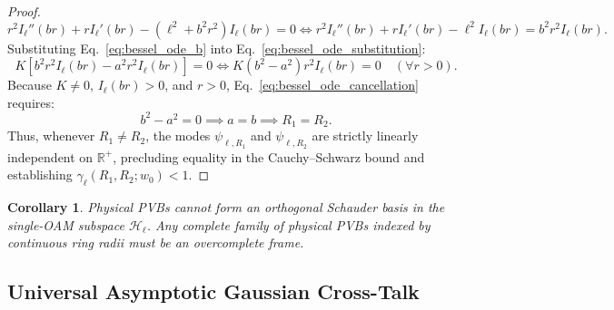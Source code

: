 \documentclass[11pt,a4paper]{article}
\newtheorem{corollary}{Corollary}
\begin{document}
\begin{proof}
\begin{equation}
r^2 I_\ell''(b r) + r I_\ell'(b r) - (\ell^2 + b^2 r^2) I_\ell(b r) = 0 \iff r^2 I_\ell''(b r) + r I_\ell'(b r) - \ell^2 I_\ell(b r) = b^2 r^2 I_\ell(b r).
\label{eq:bessel_ode_b}
\end{equation}
Substituting Eq.~\eqref{eq:bessel_ode_b} into Eq.~\eqref{eq:bessel_ode_substitution}:
\begin{equation}
K \left[ b^2 r^2 I_\ell(b r) - a^2 r^2 I_\ell(b r) \right] = 0 \iff K (b^2 - a^2) r^2 I_\ell(b r) = 0 \quad (\forall r > 0).
\label{eq:bessel_ode_cancellation}
\end{equation}
Because $K \neq 0$, $I_\ell(b r) > 0$, and $r > 0$, Eq.~\eqref{eq:bessel_ode_cancellation} requires:
\begin{equation}
b^2 - a^2 = 0 \implies a = b \implies R_1 = R_2.
\label{eq:ode_conclusion}
\end{equation}
Thus, whenever $R_1 \neq R_2$, the modes $\psi_{\ell, R_1}$ and $\psi_{\ell, R_2}$ are strictly linearly independent on $\mathbb{R}^+$, precluding equality in the Cauchy--Schwarz bound and establishing $\gamma_\ell(R_1, R_2; w_0) < 1$.
\end{proof}

\begin{corollary}
Physical PVBs cannot form an orthogonal Schauder basis in the single-OAM subspace $\mathcal{H}_\ell$. Any complete family of physical PVBs indexed by continuous ring radii must be an overcomplete frame.
\end{corollary}

\subsection{Universal Asymptotic Gaussian Cross-Talk}
\end{document}
